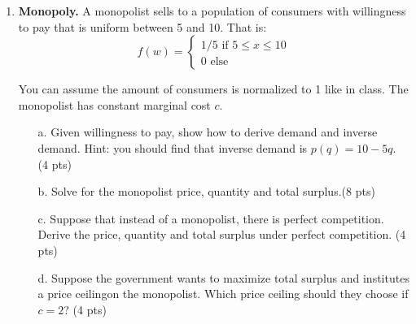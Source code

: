 \documentclass{article}
\begin{document}
\begin{enumerate}
    \item \textbf{Monopoly.} A monopolist sells to a population of consumers with willingness to pay that is uniform between 5 and 10. That is: \[f(w)=\begin{cases} 1/5 \text{ if } 5 \leq x \leq 10\\
    0 \text{ else} \end{cases}\]
    
    You can assume the amount of consumers is normalized to 1 like in class. The monopolist has constant marginal cost $c$.
    \pagebreak 
    \begin{enumerate}
        \item[a.] Given willingness to pay, show how to derive demand and inverse demand. Hint: you should find that inverse demand is $p(q)=10-5q$. (4 pts)
        
        \vspace{6cm}
        
        \item[b.] Solve for the monopolist price, quantity and total surplus.(8 pts)
        
        \vspace{10cm}
        
        \pagebreak
        
        \item[c.] Suppose that instead of a monopolist, there is perfect competition. Derive the price, quantity and total surplus under perfect competition. (4 pts)

        \vspace{6cm}
 
        
        \vspace{6cm}
        
        \item[d.] Suppose the government wants to maximize total surplus and institutes a price ceilingon the monopolist. Which price ceiling should they choose if $c=2$? (4 pts)
        
        \vspace{6cm}
        
    \end{enumerate}
    

\end{enumerate}
\end{document}
